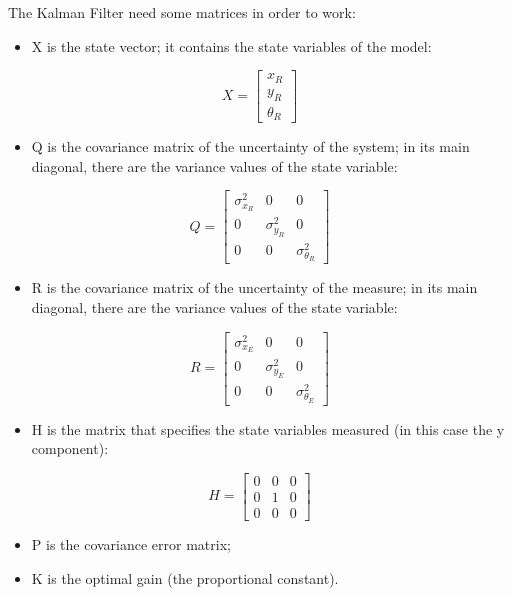 The Kalman Filter need some matrices in order to work:

\begin{itemize}
\tightlist
\item
  X is the state vector; it contains the state variables of the model:
\end{itemize}

\[
X = \begin{bmatrix}
x_R \\
y_R \\
\theta_R
\end{bmatrix}
\]

\begin{itemize}
\tightlist
\item
  Q is the covariance matrix of the uncertainty of the system; in its
  main diagonal, there are the variance values of the state variable:
\end{itemize}

\[
Q = \begin{bmatrix}
\sigma_{x_R}^2 & 0 & 0 \\
0 & \sigma_{y_R}^2 & 0 \\
0 & 0 & \sigma_{\theta_R}^2
\end{bmatrix}
\]

\begin{itemize}
\tightlist
\item
  R is the covariance matrix of the uncertainty of the measure; in its
  main diagonal, there are the variance values of the state variable:
\end{itemize}

\[
R = \begin{bmatrix}
\sigma_{x_E}^2 & 0 & 0 \\
0 & \sigma_{y_E}^2 & 0 \\
0 & 0 & \sigma_{\theta_E}^2
\end{bmatrix}
\]

\begin{itemize}
\tightlist
\item
  H is the matrix that specifies the state variables measured (in this
  case the y component):
\end{itemize}

\[
H = \begin{bmatrix}
0 & 0 & 0 \\
0 & 1 & 0 \\
0 & 0 & 0
\end{bmatrix}
\]

\begin{itemize}
\tightlist
\item
  P is the covariance error matrix;
\item
  K is the optimal gain (the proportional constant).
\end{itemize}


